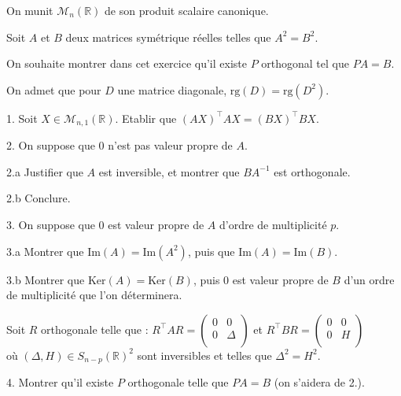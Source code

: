 \noindent On munit $\mathcal{M}_n(\mathbb{R})$ de son produit scalaire canonique.

\noindent Soit $A$ et $B$ deux matrices symétrique réelles telles que $A^2=B^2$.

\noindent On souhaite montrer dans cet exercice qu'il existe $P$ orthogonal tel que $PA = B$.

\noindent On admet que pour $D$ une matrice diagonale, $\mathrm{rg}(D) = \mathrm{rg}(D^2)$.

\vspace{5pt}
1. Soit $X \in \mathcal{M}_{n,1}(\mathbb{R})$. Etablir que $(AX)^\top AX = (BX)^\top BX$.

\vspace{5pt}
2. On suppose que $0$ n'est pas valeur propre de $A$.

\vspace{5pt}
\quad 2.a Justifier que $A$ est inversible, et montrer que $BA^{-1}$ est orthogonale.

\vspace{5pt}
\quad 2.b Conclure.

\vspace{5pt}
3. On suppose que $0$ est valeur propre de $A$ d'ordre de multiplicité $p$.

\vspace{5pt}
\quad 3.a Montrer que $\mathrm{Im}(A) = \mathrm{Im}(A^2)$, puis que $\mathrm{Im}(A) = \mathrm{Im}(B)$.

\vspace{5pt}
\quad 3.b Montrer que $\mathrm{Ker}(A) = \mathrm{Ker}(B)$, puis $0$ est valeur propre de $B$ d'un ordre de multiplicité que l'on déterminera.

\vspace{5pt}
\noindent Soit $R$ orthogonale telle que : $R^\top AR =
\begin{pmatrix}
0 & 0 \\
0 & \Delta \\
\end{pmatrix}
$
et $R^\top BR = 
\begin{pmatrix}
0 & 0 \\
0 & H \\
\end{pmatrix}
$ \\
où $(\Delta, H) \in S_{n-p}(\mathbb{R})^2$ sont inversibles et telles que $\Delta^2 = H^2$.

\vspace{5pt}
4. Montrer qu'il existe $P$ orthogonale telle que $PA = B$ (on s'aidera de 2.).

